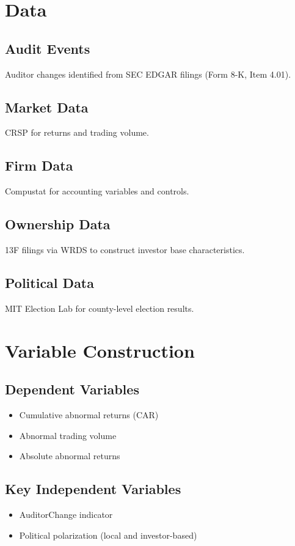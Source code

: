 \documentclass[12pt]{article}
\begin{document}
\section{Data}

\subsection{Audit Events}
Auditor changes identified from SEC EDGAR filings (Form 8-K, Item 4.01).

\subsection{Market Data}
CRSP for returns and trading volume.

\subsection{Firm Data}
Compustat for accounting variables and controls.

\subsection{Ownership Data}
13F filings via WRDS to construct investor base characteristics.

\subsection{Political Data}
MIT Election Lab for county-level election results.

\section{Variable Construction}

\subsection{Dependent Variables}
\begin{itemize}
\item Cumulative abnormal returns (CAR)
\item Abnormal trading volume
\item Absolute abnormal returns
\end{itemize}

\subsection{Key Independent Variables}
\begin{itemize}
\item AuditorChange indicator
\item Political polarization (local and investor-based)
\end{itemize}
\end{document}
